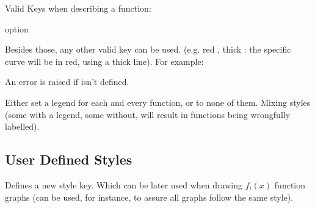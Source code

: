 \documentclass[10pt]{article}
\begin{document}
Valid Keys when describing a function:
\begin{describelist*}{option}
\end{describelist*}
Besides those, any other  valid key can be used. (e.g. red , thick : the specific curve will be in red, using a thick line). For example:
\begin{codestore}[fxset-01]

\end{codestore}


\begin{tsremark}
An error is raised if  isn't defined.
\end{tsremark}
\begin{tsremark}
Either set a legend for each and every function, or to none of them. Mixing styles (some with a legend, some without, will result in functions being wrongfully labelled).
\end{tsremark}


\subsection{User Defined Styles}\label{style-def}

\begin{codedescribe}{\fxsetnewstyle}
\begin{codesyntax}%
\end{codesyntax}
Defines a new  style key. Which can be later used when drawing $f_i(x)$ function graphs (can be used, for instance, to assure all graphs follow the same style).
\end{codedescribe}
\end{document}
